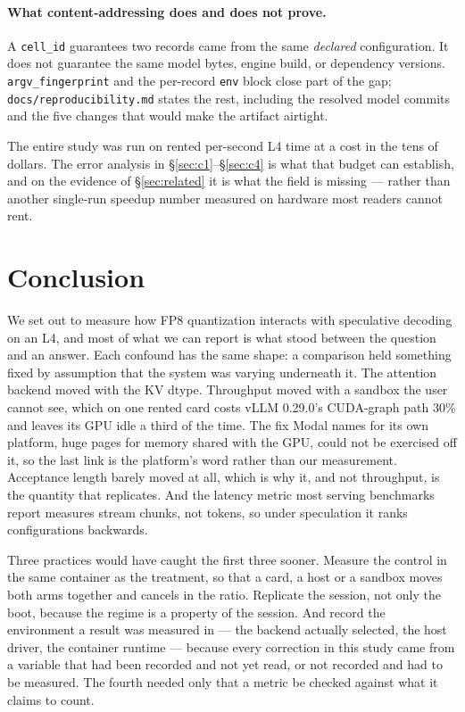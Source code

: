 \documentclass[11pt]{article}
\newcommand{\tw}[1]{\texttt{\small #1}}
\begin{document}
\paragraph{What content-addressing does and does not prove.} A
\tw{cell\_id} guarantees two records came from the same \emph{declared}
configuration. It does not guarantee the same model bytes, engine build, or
dependency versions. \tw{argv\_fingerprint} and the per-record \tw{env}
block close part of the gap; \tw{docs/reproducibility.md} states the rest,
including the resolved model commits and the five changes that would make
the artifact airtight.

The entire study was run on rented per-second L4 time at a cost in the tens
of dollars. The error analysis in \S\ref{sec:c1}--\S\ref{sec:c4} is what that
budget can establish, and on the evidence of \S\ref{sec:related} it is what
the field is missing --- rather than another single-run speedup number
measured on hardware most readers cannot rent.

\section{Conclusion}\label{sec:conclusion}

We set out to measure how FP8 quantization interacts with speculative
decoding on an L4, and most of what we can report is what stood between the
question and an answer. Each confound has the same shape: a comparison held
something fixed by assumption that the system was varying underneath it.
The attention backend moved with the KV dtype. Throughput moved with a
sandbox the user cannot see, which on one rented card costs vLLM 0.29.0's
CUDA-graph path 30\% and leaves its GPU idle a third of the time.
The fix Modal names for its own platform, huge pages for memory shared with
the GPU, could not be exercised off it, so the last link is the platform's
word rather than our measurement.
Acceptance length barely moved at all, which is why it, and not throughput,
is the quantity that replicates. And the latency metric most serving
benchmarks report measures stream chunks, not tokens, so under speculation
it ranks configurations backwards.

Three practices would have caught the first three sooner. Measure the control in the same
container as the treatment, so that a card, a host or a sandbox moves both
arms together and cancels in the ratio. Replicate the session, not only the
boot, because the regime is a property of the session. And record the
environment a result was measured in --- the backend actually selected, the
host driver, the container runtime --- because every correction in this
study came from a variable that had been recorded and not yet read, or not
recorded and had to be measured. The fourth needed only that a metric be
checked against what it claims to count.
\end{document}
